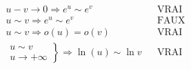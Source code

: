\begin{align*}
 &u-v \rightarrow 0 \Rightarrow e^{u}\sim e^v & & \text{VRAI}\\
 &u \sim v \Rightarrow e^{u}\sim e^v  & & \text{FAUX}\\
 &u \sim v  \Rightarrow o(u) = o(v)  & & \text{VRAI}\\
 &\left. 
\begin{aligned}
u \sim v \\ u \rightarrow +\infty  
\end{aligned}
 \right\rbrace \Rightarrow \ln(u) \sim \ln v  & & \text{VRAI}
\end{align*}